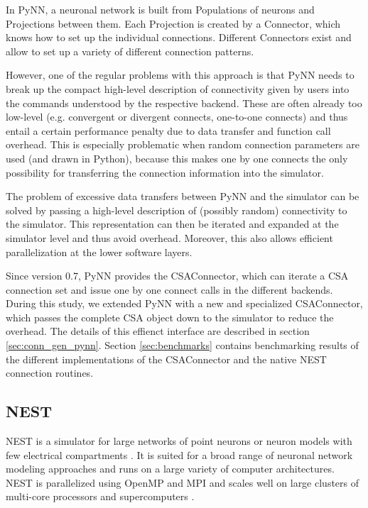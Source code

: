 \documentclass{frontiersSCNS} %
\begin{document}
In PyNN, a neuronal network is built from Populations of neurons and
Projections between them. Each Projection is created by a Connector,
which knows how to set up the individual connections. Different
Connectors exist and allow to set up a variety of different connection
patterns.

However, one of the regular problems with this approach is that PyNN
needs to break up the compact high-level description of connectivity
given by users into the commands understood by the respective
backend. These are often already too low-level (e.g. convergent or
divergent connects, one-to-one connects) and thus entail a certain
performance penalty due to data transfer and function call
overhead. This is especially problematic when random connection
parameters are used (and drawn in Python), because this makes one by
one connects the only possibility for transferring the connection
information into the simulator.

The problem of excessive data transfers between PyNN and the simulator
can be solved by passing a high-level description of (possibly random)
connectivity to the simulator. This representation can then be
iterated and expanded at the simulator level and thus avoid
overhead. Moreover, this also allows efficient parallelization at the
lower software layers.

Since version 0.7, PyNN provides the CSAConnector, which can iterate a
CSA connection set and issue one by one connect calls in the different
backends. During this study, we extended PyNN with a new and
specialized CSAConnector, which passes the complete CSA object down to
the simulator to reduce the overhead. The details of this effienct
interface are described in section \ref{sec:conn_gen_pynn}. Section
\ref{sec:benchmarks} contains benchmarking results of the different
implementations of the CSAConnector and the native NEST connection
routines.

\subsection{NEST}

NEST is a simulator for large networks of point neurons or neuron
models with few electrical compartments
\citep[http://www.nest-initiative.org;][]{Gewaltig_07_11204}. It is
suited for a broad range of neuronal network modeling approaches and
runs on a large variety of computer architectures. NEST is
parallelized using OpenMP \citep{OpenMPSpec} and MPI
\citep{MPIForum94} and scales well on large clusters of multi-core
processors and supercomputers \citep{Helias12_26}.
\end{document}
